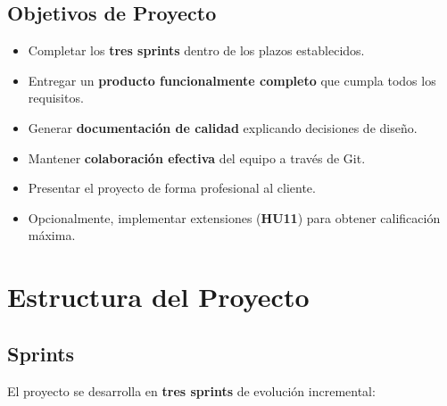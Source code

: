 \documentclass[12pt, a4paper]{article}
\begin{document}
\subsection{Objetivos de Proyecto}

\begin{itemize}[leftmargin=2em]
    \item Completar los \textbf{tres sprints} dentro de los plazos establecidos.
    \item Entregar un \textbf{producto funcionalmente completo} que cumpla todos los requisitos.
    \item Generar \textbf{documentación de calidad} explicando decisiones de diseño.
    \item Mantener \textbf{colaboración efectiva} del equipo a través de Git.
    \item Presentar el proyecto de forma profesional al cliente.
    \item Opcionalmente, implementar extensiones (\textbf{HU11}) para obtener calificación máxima.
\end{itemize}

\section{Estructura del Proyecto}

\subsection{Sprints}

El proyecto se desarrolla en \textbf{tres sprints} de evolución incremental:
\end{document}
